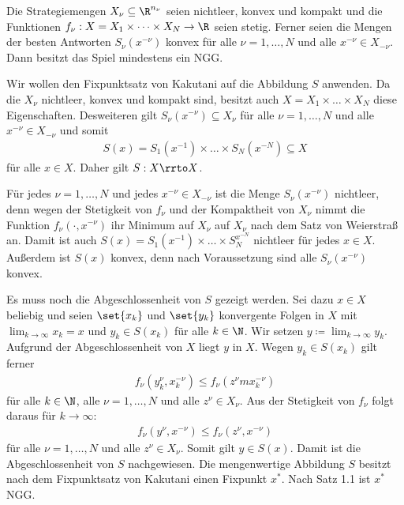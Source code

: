 \begin{satz}
  Die Strategiemengen $X_{\nu} \subseteq \R^{n_{\nu}}$ seien nichtleer, konvex und kompakt und die Funktionen $f_{\nu}: X = X_{1} \times \dots \times X_{N} \to \R$ seien stetig. Ferner seien die Mengen der besten Antworten $S_{\nu}(x^{-\nu})$ konvex für alle $\nu = 1, \dots, N$ und alle $x^{-\nu}\in X_{- \nu}$. Dann besitzt das Spiel mindestens ein NGG. 
\end{satz}
\begin{beweis}
  Wir wollen den Fixpunktsatz von Kakutani auf die Abbildung $S$ anwenden. Da die $X_{\nu}$ nichtleer, konvex und kompakt sind, besitzt auch $X = X_{1}\times \dots \times X_{N}$ diese Eigenschaften. Desweiteren gilt $S_\nu(x^{-\nu}) \subseteq X_{\nu}$ für alle $\nu = 1, \dots, N$ und alle $x^{-\nu} \in X_{-\nu}$ und somit
  \begin{align*}
    S(x)=S_{1}(x^{-1})\times \dots \times S_{N}(x^{-N})\subseteq X
  \end{align*}
für alle $x \in X$. Daher gilt $S: X \rrto X$. 

Für jedes $\nu = 1, \dots, N$ und jedes $x^{-\nu} \in X_{-\nu}$ ist die Menge $S_{\nu}(x^{-\nu})$ nichtleer, denn wegen der Stetigkeit von $f_{\nu}$ und der Kompaktheit von $X_{\nu}$ nimmt die Funktion $f_{\nu}(\cdot, x^{-\nu})$ ihr Minimum auf $X_{\nu}$ auf $X_{\nu}$ nach dem Satz von Weierstraß an. Damit ist auch $S(x) = S_{1}(x^{-1}) \times \dots \times S_{N}^{x^{-N}}$ nichtleer für jedes $x \in X$. Außerdem ist $S(x)$ konvex, denn nach Voraussetzung sind alle $S_{\nu}(x^{-\nu})$ konvex. 

Es muss noch die Abgeschlossenheit von $S$ gezeigt werden. Sei dazu $x \in X$ beliebig und seien $\set{x_{k}}$ und $\set{y_{k}}$ konvergente Folgen in $X$ mit $\lim_{k \to \infty} x_{k} = x$ und $y_{k} \in S(x_{k})$ für alle $k \in \N$. Wir setzen $y \coloneqq \lim_{k \to \infty} y_{k}$. Aufgrund der Abgeschlossenheit von $X$ liegt $y$ in $X$. Wegen $y_{k} \in S(x_{k})$ gilt ferner
\begin{align*}
  f_{\nu}(y_{k}^{\nu}, x_{k}^{-\nu})\leq f_{\nu}(z^{\nu}m x_{k}^{- \nu})
\end{align*}
für alle $k \in \N$, alle $\nu = 1, \dots, N$ und alle $z^{\nu} \in X_{\nu}$. Aus der Stetigkeit von $f_{\nu}$ folgt daraus für $k \to \infty$: 
\begin{align*}
  f_{\nu}(y^{\nu}, x^{-\nu})\leq f_{\nu}(z^{\nu}, x^{-\nu})
\end{align*}
für alle $\nu = 1, \dots, N$ und alle $z^{\nu} \in X_{\nu}$. Somit gilt $y \in S(x)$. Damit ist die Abgeschlossenheit von $S$ nachgewiesen. Die mengenwertige Abbildung $S$ besitzt nach dem Fixpunktsatz von Kakutani einen Fixpunkt $x^{*}$. Nach Satz 1.1 ist $x^{*}$ NGG.  
\end{beweis}
